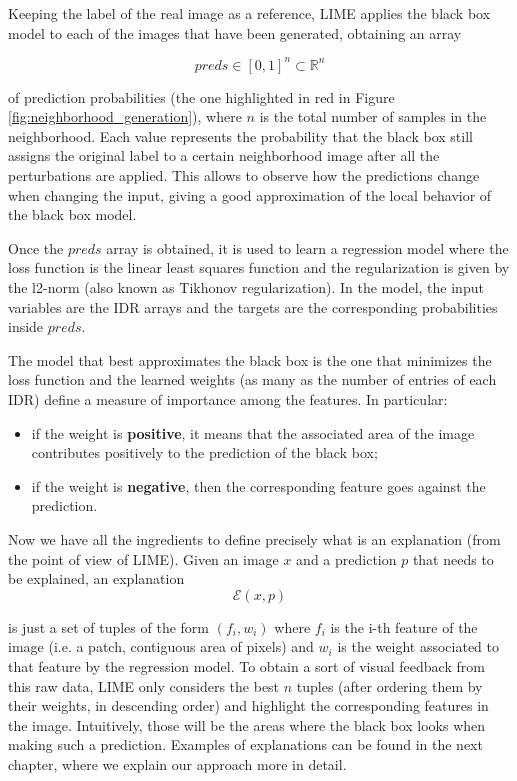 \documentclass[12pt, twoside, a4paper]{report}
\begin{document}
Keeping the label of the real image as a reference, LIME applies the black box model to each of the images that have been generated, obtaining an array 

\[
	preds \in  [0, 1]^{n}\subset \mathbb{R}^{n}
\]

of prediction probabilities (the one highlighted in red in Figure \ref{fig:neighborhood_generation}), where $n$ is the total number of samples in the neighborhood. Each value represents the probability that the black box still assigns the original label to a certain neighborhood image after all the perturbations are applied.
This allows to observe how the predictions change when changing the input, giving a good approximation of the local behavior of the black box model.

Once the $preds$ array is obtained, it is used to learn a regression model where the loss function is the linear least squares function and the regularization is given by the l2-norm (also known as Tikhonov regularization). In the model, the input variables are the IDR arrays and the targets are the corresponding probabilities inside $preds$.
 
The model that best approximates the black box is the one that minimizes the loss function and the learned weights (as many as the number of entries of each IDR) define a measure of importance among the features. In particular:

\begin{itemize}
\item if the weight is \textbf{positive}, it means that the associated area of the image contributes positively to the prediction of the black box;
\item if the weight is \textbf{negative}, then the corresponding feature goes against the prediction.
\end{itemize}

Now we have all the ingredients to define precisely what is an explanation (from the point of view of LIME). Given an image $x$ and a prediction $p$ that needs to be explained, an explanation 
\[
	\mathcal{E}(x,p)
\]

is just a set of tuples of the form $(f_{i},w_{i})$ where $f_{i}$ is the i-th feature of the image (i.e. a patch, contiguous area of pixels) and $w_{i}$ is the weight associated to that feature by the regression model. To obtain a sort of visual feedback from this raw data, LIME only considers the best $n$ tuples (after ordering them by their weights, in descending order) and highlight the corresponding features in the image. Intuitively, those will be the areas where the black box looks when making such a prediction. Examples of explanations can be found in the next chapter, where we explain our approach more in detail.
\end{document}

